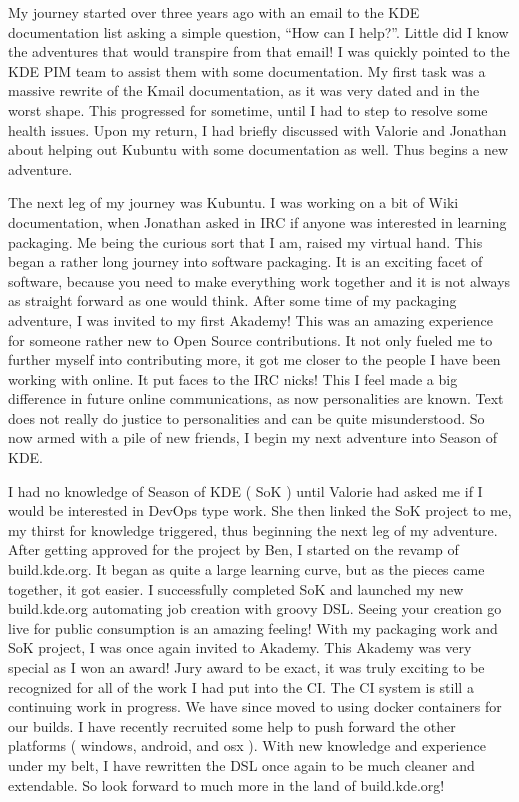 

\noindent{}My journey started over three years ago with an email to the KDE documentation list asking a simple question, “How can I help?”. Little did I know the adventures that would transpire from that email! I was quickly pointed to the KDE PIM team to assist them with some documentation.  My first task was a massive rewrite of the Kmail documentation, as it was very dated and in the worst shape. This progressed for sometime, until I had to step to resolve some health issues. Upon my return, I had briefly discussed with Valorie and Jonathan about helping out Kubuntu with some documentation as well. Thus begins a new adventure.

The next leg of my journey was Kubuntu. I was working on a bit of Wiki documentation, when Jonathan asked in IRC if anyone was interested in learning packaging. Me being the curious sort that I am, raised my virtual hand. This began a rather long journey into software packaging. It is an exciting facet of software, because you need to make everything work together and it is not always as straight forward as one would think. After some time of my packaging adventure, I was invited to my first Akademy! This was an amazing experience for someone rather new to Open Source contributions. It not only fueled me to further myself into contributing more, it got me closer to the people I have been working with online. It put faces to the IRC nicks! This I feel made a big difference in future online communications, as now personalities are known. Text does not really do justice to personalities and can be quite misunderstood. So now armed with a pile of new friends, I begin my next adventure into Season of KDE.

I had no knowledge of Season of KDE ( SoK ) until Valorie had asked me if I would be interested in DevOps type work. She then linked the SoK project to me, my thirst for knowledge triggered, thus beginning the next leg of my adventure. After getting approved for the project by Ben, I started on the revamp of build.kde.org. It began as quite a large learning curve, but as the pieces came together, it got easier. I successfully completed SoK and launched my new build.kde.org automating job creation with groovy DSL.  Seeing your creation go live for public consumption is an amazing feeling! With my packaging work and SoK project, I was once again invited to Akademy. This Akademy was very special as I won an award! Jury award to be exact, it was truly exciting to be recognized for all of the work I had put into the CI. The CI system is still a continuing work in progress. We have since moved to using docker containers for our builds. I have recently recruited some help to push forward the other platforms ( windows, android, and osx ). With new knowledge and experience under my belt, I have rewritten the DSL once again to be much cleaner and extendable. So look forward to much more in the land of build.kde.org!
